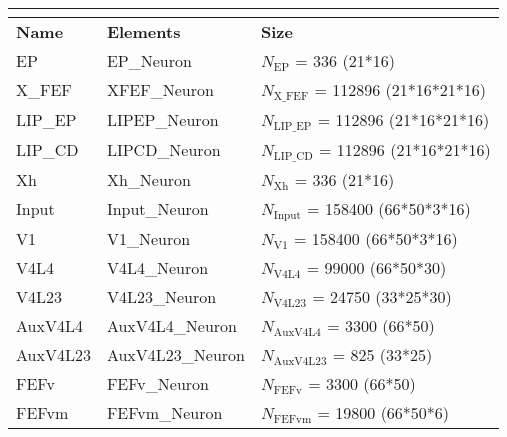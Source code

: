 \documentclass{article}
\newcommand{\hdr}[3]{
    \multicolumn{#1}{|l|}{
        \color{white}\cellcolor[gray]{0.0}
        \textbf{\makebox[0pt]{#2}\hspace{0.5\linewidth}\makebox[0pt][c]{#3}}
    }
}
\begin{document}
\noindent
\begin{tabularx}{\linewidth}{|l|l|X|}\hline
\hdr{3}{B}{Populations}\\ \hline
    \textbf{Name}   & \textbf{Elements} & \textbf{Size} \\ \hline

    EP             & EP\_Neuron        & $N_{\text{EP}}$ = 336 (21*16)  \\ \hline

    X\_FEF             & XFEF\_Neuron        & $N_{\text{X\_FEF}}$ = 112896 (21*16*21*16)  \\ \hline

    LIP\_EP             & LIPEP\_Neuron        & $N_{\text{LIP\_EP}}$ = 112896 (21*16*21*16)  \\ \hline

    LIP\_CD             & LIPCD\_Neuron        & $N_{\text{LIP\_CD}}$ = 112896 (21*16*21*16)  \\ \hline

    Xh             & Xh\_Neuron        & $N_{\text{Xh}}$ = 336 (21*16)  \\ \hline

    Input             & Input\_Neuron        & $N_{\text{Input}}$ = 158400 (66*50*3*16)  \\ \hline

    V1             & V1\_Neuron        & $N_{\text{V1}}$ = 158400 (66*50*3*16)  \\ \hline

    V4L4             & V4L4\_Neuron        & $N_{\text{V4L4}}$ = 99000 (66*50*30)  \\ \hline

    V4L23             & V4L23\_Neuron        & $N_{\text{V4L23}}$ = 24750 (33*25*30)  \\ \hline

    AuxV4L4             & AuxV4L4\_Neuron        & $N_{\text{AuxV4L4}}$ = 3300 (66*50)  \\ \hline

    AuxV4L23             & AuxV4L23\_Neuron        & $N_{\text{AuxV4L23}}$ = 825 (33*25)  \\ \hline

    FEFv             & FEFv\_Neuron        & $N_{\text{FEFv}}$ = 3300 (66*50)  \\ \hline

    FEFvm             & FEFvm\_Neuron        & $N_{\text{FEFvm}}$ = 19800 (66*50*6)  \\ \hline


\end{tabularx}
\end{document}

